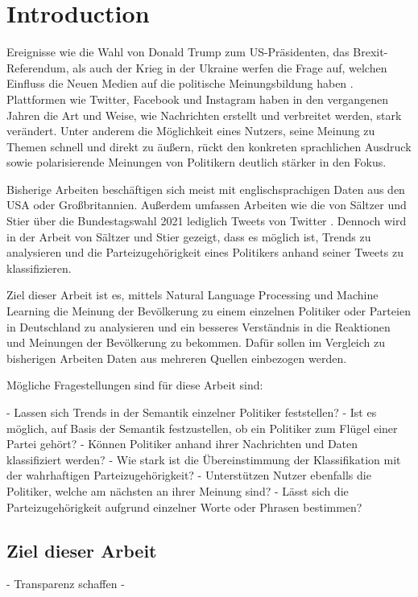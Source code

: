 
\chapter{Introduction} \label{ch:introduction}

Ereignisse wie die Wahl von Donald Trump zum US-Präsidenten, das Brexit-Referendum, als auch der Krieg in der Ukraine werfen die Frage auf, welchen Einfluss die Neuen Medien auf die politische Meinungsbildung haben \autocite{brandon_russia_2022, lee_how_2020}. Plattformen wie Twitter, Facebook und Instagram haben in den vergangenen Jahren die Art und Weise, wie Nachrichten erstellt und verbreitet werden, stark verändert. Unter anderem die Möglichkeit eines Nutzers, seine Meinung zu Themen schnell und direkt zu äußern, rückt den konkreten sprachlichen Ausdruck sowie polarisierende Meinungen von Politikern deutlich stärker in den Fokus.

Bisherige Arbeiten beschäftigen sich meist mit englischsprachigen Daten aus den USA oder Großbritannien. Außerdem umfassen Arbeiten wie die von Sältzer und Stier über die Bundestagswahl 2021 lediglich Tweets von Twitter \autocite{saltzer_bundestagswahl_2022}. Dennoch wird in der Arbeit von Sältzer und Stier gezeigt, dass es möglich ist, Trends zu analysieren und die Parteizugehörigkeit eines Politikers anhand seiner Tweets zu klassifizieren.

Ziel dieser Arbeit ist es, mittels Natural Language Processing und Machine Learning die Meinung der Bevölkerung zu einem einzelnen Politiker oder Parteien in Deutschland zu analysieren und ein besseres Verständnis in die Reaktionen und Meinungen der Bevölkerung zu bekommen. Dafür sollen im Vergleich zu bisherigen Arbeiten Daten aus mehreren Quellen einbezogen werden.

Mögliche Fragestellungen sind für diese Arbeit sind:

-   Lassen sich Trends in der Semantik einzelner Politiker feststellen?
-   Ist es möglich, auf Basis der Semantik festzustellen, ob ein Politiker zum Flügel einer Partei gehört?
-   Können Politiker anhand ihrer Nachrichten und Daten klassifiziert werden?
-   Wie stark ist die Übereinstimmung der Klassifikation mit der wahrhaftigen Parteizugehörigkeit?
-   Unterstützen Nutzer ebenfalls die Politiker, welche am nächsten an ihrer Meinung sind?
-   Lässt sich die Parteizugehörigkeit aufgrund einzelner Worte oder Phrasen bestimmen?

\section{Ziel dieser Arbeit} \label{sec:thesisGoal}

- Transparenz schaffen
- 
